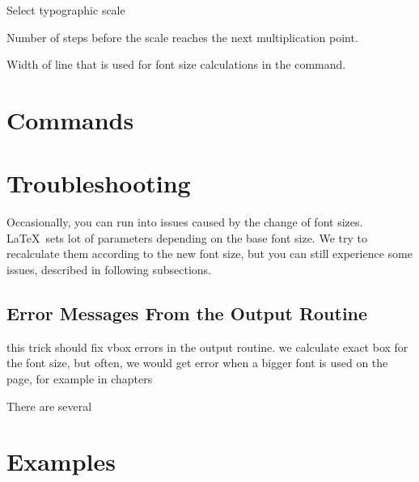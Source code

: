 \documentclass{ltxdoc}
\begin{document}
\noindent {} Select typographic scale

\noindent {} Number of steps before the scale reaches the next multiplication point.

\noindent {} 

\noindent {} 

\noindent {} Width of line that is used for font size calculations in the \cmd{\setsizes} command.




\section{Commands}

\DescribeMacro\setsizes
\cmd\setsizes{}


\section{Troubleshooting}

Occasionally, you can run into issues caused by the change of font sizes. \LaTeX\ sets lot of parameters 
depending on the base font size. We try to recalculate them according to the new font size, but you can still
experience some issues, described in following subsections.

\subsection{Error Messages From the Output Routine }

this trick should fix vbox errors in the output routine. 
we calculate exact box for the font size, but often,
we would get error when a bigger font is used on the page,
for example in chapters

There are several 
  \def\@textbottom{\vskip \z@ \@plus \resp_font_size \@minus \resp_font_size}
\section{Examples}
\end{document}
